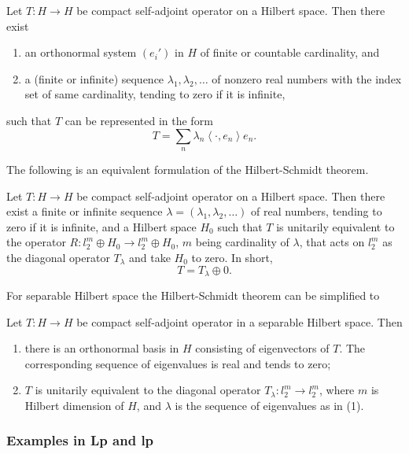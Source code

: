 \begin{theorem}
	\label{thm:HilbertSchmidt}
	Let $T: H \to H$ be compact self-adjoint operator on a Hilbert space. Then there exist
	\begin{enumerate}
		\item an orthonormal system $(e_i')$ in $H$ of finite or countable cardinality, and
		\item a (finite or infinite) sequence $\lambda_1 , \lambda_2 , \ldots$ of nonzero real numbers with the index set of same cardinality, tending to zero if it is infinite,
	\end{enumerate}
	such that $T$ can be represented in the form
	\[
		T = \sum_n \lambda_n \left\langle \cdot , e_n \right\rangle e_n
	.\] 
\end{theorem}

The following is an equivalent formulation of the Hilbert-Schmidt theorem.

\begin{proposition}
	\label{prop:HilbertSchmidtEquiv}
	Let $T: H \to H$ be compact self-adjoint operator on a Hilbert space. Then there exist a finite or infinite sequence $\lambda = (\lambda_1, \lambda_2, \ldots)$ of real numbers, tending to zero if it is infinite, and a Hilbert space $H_0$ such that $T$ is unitarily equivalent to the operator $R: l_2^m \oplus H_0 \to  l_2^m \oplus H_0$, $m$ being cardinality of $\lambda$, that acts on $l_2^m$ as the diagonal operator $T_\lambda$ and take $H_0$ to zero. In short,
	\[
		T = T_\lambda \oplus 0
	.\] 
\end{proposition}

For separable Hilbert space the Hilbert-Schmidt theorem can be simplified to

\begin{proposition}
	\label{prop:HilbertSchmidtSep}
	Let $T: H \to H$ be compact self-adjoint operator in a separable Hilbert space. Then
	\begin{enumerate}
		\item there is an orthonormal basis in $H$ consisting of eigenvectors of $T$. The corresponding sequence of eigenvalues is real and tends to zero;
		\item $T$ is unitarily equivalent to the diagonal operator $T_\lambda: l_2^m \to l_2^m$, where $m$ is Hilbert dimension of $H$, and $\lambda$ is the sequence of eigenvalues as in (1).
	\end{enumerate}
\end{proposition}


\subsubsection{Examples in Lp and lp}

